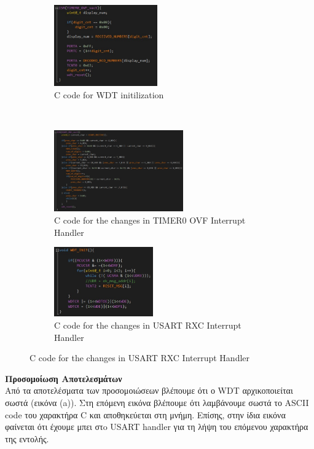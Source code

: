 \documentclass{article}
\begin{document}
	\pagebreak
	\begin{figure}[h!]
		\centering
		\begin{subfigure}[t]{0.5\textwidth}
			\centering
			\includegraphics[height=3.5cm, width=\linewidth]{./results/lab6_timer0_changes.jpg}
			\caption{C code for WDT initilization}
		\end{subfigure}%
		~
		\begin{subfigure}[t]{0.5\textwidth}
			\centering
			\includegraphics[height=3.5cm, width=\linewidth]{./results/lab6_usart_changes.jpg}
			\caption{C code for the changes in TIMER0 OVF Interrupt Handler}
		\end{subfigure}
	
		\begin{subfigure}[t]{0.5\textwidth}
			\centering
			\includegraphics[height=3cm, width=\linewidth]{./results/lab6_wdt_init.jpg}
			\caption{C code for the changes in USART RXC Interrupt Handler}
		\end{subfigure}%
	\end{figure}

	\noindent
	\textbf{Προσομοίωση Αποτελεσμάτων} \\
	
	\noindent
	Aπό τα αποτελέσματα των προσομοιώσεων βλέπουμε ότι ο WDT αρχικοποιείται σωστά (εικόνα (a)). Στη επόμενη εικόνα βλέπουμε ότι λαμβάνουμε σωστά το ASCII code του χαρακτήρα C και αποθηκεύεται στη μνήμη. Επίσης, στην ίδια εικόνα φαίνεται ότι έχουμε μπει στo USART handler για τη λήψη του επόμενου χαρακτήρα της εντολής. \\
	
\end{document}
